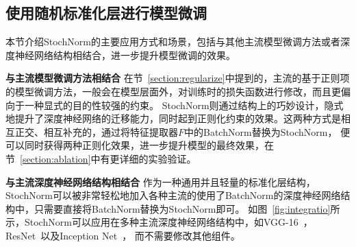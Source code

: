 


\subsection{使用随机标准化层进行模型微调}

本节介绍StochNorm的主要应用方式和场景，包括与其他主流模型微调方法或者深度神经网络结构相结合，进一步提升模型微调的效果。

\textbf{与主流模型微调方法相结合 } 在节~\ref{section:regularize}中提到的，主流的基于正则项的模型微调方法，一般会在模型层面外，对训练时的损失函数进行修改，而且更偏向于一种显式的目的性较强的约束。
StochNorm则通过结构上的巧妙设计，隐式地提升了深度神经网络的迁移能力，同时起到正则化约束的效果。这两种方式是相互正交、相互补充的，通过将特征提取器$F$中的BatchNorm替换为StochNorm，
便可以同时获得两种正则化效果，进一步提升模型的最终效果，在节~\ref{section:ablation}中有更详细的实验验证。

\textbf{与主流深度神经网络结构相结合 } 作为一种通用并且轻量的标准化层结构，StochNorm可以被非常轻松地加入各种主流的使用了BatchNorm的深度神经网络结构中，只需要直接将BatchNorm替换为StochNorm即可。
如图~\ref{fig:integratio}所示，StochNorm可以应用在多种主流深度神经网络结构中，如VGG-16~\citep{simonyan2015very}，ResNet~\citep{he2016deep}以及Inception Net~\citep{szegedy2016rethinking}，
而不需要修改其他组件。

